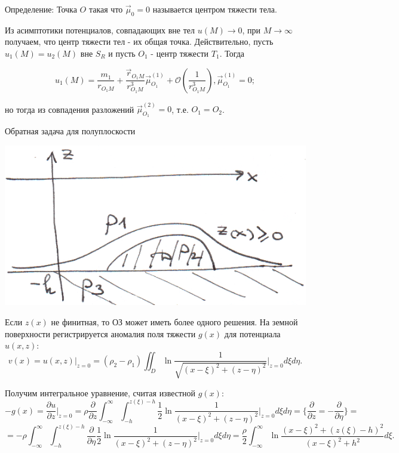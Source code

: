 \documentclass{article}
\begin{document}
Определение: Точка $O$ такая что $\overrightarrow{\mu}_0 = 0$ называется центром тяжести тела.

Из асимптотики  потенциалов, совпадающих вне тел $u(M) \to 0$, при $M \to \infty$ получаем, что центр тяжести тел - их общая точка. Действительно, пусть $u_1(M) = u_2(M)$ вне $S_R$ и пусть $O_1$ - центр тяжести $T_1$. Тогда

\[
u_1(M) = \dfrac{m_1}{r_{O_1M}} + \dfrac{\overrightarrow{r}_{O_1M}}{r_{O_1M}^3} \overrightarrow{\mu}_{O_1}^{(1)} + \mathcal{O}(\dfrac{1}{r_{O_1M}^3}), 
\overrightarrow{\mu}_{O_1}^{(1)} = 0;
\]

но тогда из совпадения разложений $ \overrightarrow{\mu}_{O_1
}^{(2)} = 0 $, т.е. $ O_1 = O_2 $.


\vspace{1cm}
\centerline{\large Обратная задача для полуплоскости}

\vspace{0.5cm}
\includegraphics[scale=0.85]{pic2.png}

Если $z(x)$ не финитная, то ОЗ может иметь более одного решения.
На земной поверхности регистрируется аномалия поля тяжести $g(x)$ для потенциала $u(x,z)$:
\[
v(x) = u(x,z) \bigg|_{z = 0} = (\rho_2 - \rho_1) \iint_D \ln \dfrac{1}{\sqrt{(x-\xi)^2 + (z - \eta)^2}} \bigg|_{z=0} d\xi d\eta.
\]

Получим интегральное уравнение, считая известной $g(x)$:
\[
-g(x) = \dfrac{\partial u}{\partial z} \bigg|_{z = 0} = \rho \dfrac{\partial}{\partial z} \int_{-\infty}^{\infty} \int_{-h}^{z(\xi)-h} \dfrac{1}{2} \ln \dfrac{1}{(x-\xi)^2 + (z - \eta)^2} \bigg|_{z=0} d\xi d\eta = \{ \dfrac{\partial}{\partial z} =
 - \dfrac{\partial}{\partial \eta} \} =
\]
\[
= -\rho \int_{-\infty}^{\infty} \int_{-h}^{z(\xi)-h} \dfrac{\partial}{\partial \eta} \dfrac{1}{2} \ln \dfrac{1}{(x-\xi)^2 + (z - \eta)^2} \bigg|_{z=0} d\xi d\eta =
 \dfrac{\rho}{2} \int_{-\infty}^{\infty} \ln \dfrac{(x-\xi)^2 + (z(\xi) - h)^2}{(x-\xi)^2 + h^2} d\xi.
\]
\end{document}
